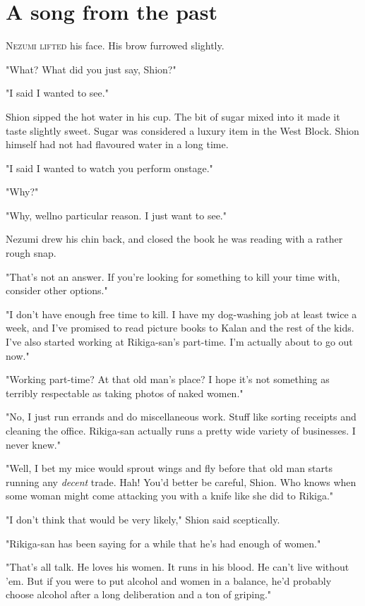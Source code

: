 
\chapter{A song from the past}

\lettrine{N}{ezumi lifted} his face. His brow furrowed slightly.

"What? What did you just say, Shion?"

"I said I wanted to see."

Shion sipped the hot water in his cup. The bit of sugar mixed into it
made it taste slightly sweet. Sugar was considered a luxury item in the
West Block. Shion himself had not had flavoured water in a long time.

"I said I wanted to watch you perform onstage."

"Why?"

"Why, well\el no particular reason. I just want to see."

Nezumi drew his chin back, and closed the book he was reading with a
rather rough snap.

"That's not an answer. If you're looking for something to kill your time
with, consider other options."

"I don't have enough free time to kill. I have my dog-washing job at
least twice a week, and I've promised to read picture books to Kalan and
the rest of the kids. I've also started working at Rikiga-san's
part-time. I'm actually about to go out now."

"Working part-time? At that old man's place? I hope it's not something
as terribly respectable as taking photos of naked women."

"No, I just run errands and do miscellaneous work. Stuff like sorting
receipts and cleaning the office. Rikiga-san actually runs a pretty wide
variety of businesses. I never knew."

"Well, I bet my mice would sprout wings and fly before that old man
starts running any \emph{decent} trade. Hah! You'd better be careful, Shion.
Who knows when some woman might come attacking you with a knife like she
did to Rikiga."

"I don't think that would be very likely," Shion said sceptically.~

"Rikiga-san has been saying for a while that he's had enough of women."

"That's all talk. He loves his women. It runs in his blood. He can't
live without 'em. But if you were to put alcohol and women in a balance,
he'd probably choose alcohol after a long deliberation and a ton of
griping."

